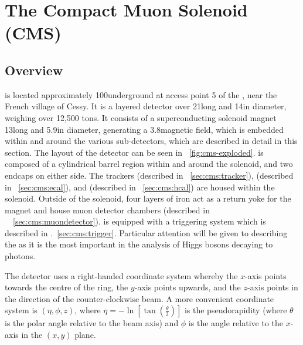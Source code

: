 \section{The Compact Muon Solenoid (CMS)}
\label{sec:cms}

\subsection{Overview}
\label{sec:cms:overview}

\CMS is located approximately 100\m underground at access point 5 of the \LHC, near the French village of Cessy. It is a layered detector over 21\m long and 14\m in diameter, weighing over 12,500 tons. It consists of a superconducting solenoid magnet 13\m long and 5.9\m in diameter, generating a 3.8\T magnetic field, which is embedded within and around the various sub-detectors, which are described in detail in this section. The layout of the \CMS detector can be seen in \Fig~\ref{fig:cms-exploded}. \CMS is composed of a cylindrical barrel region within and around the solenoid, and two endcaps on either side. The trackers (described in \Sec~\ref{sec:cms:tracker}), \ECAL (described in \Sec~\ref{sec:cms:ecal}), and \HCAL (described in \Sec~\ref{sec:cms:hcal}) are housed within the solenoid. Outside of the solenoid, four layers of iron act as a return yoke for the magnet and house muon detector chambers (described in \Sec~~\ref{sec:cms:muondetector}). \CMS is equipped with a triggering system which is described in \Sec.~\ref{sec:cms:trigger}. Particular attention will be given to describing the \ECAL as it is the most important \subdetector in the analysis of Higgs bosons decaying to photons.

The \CMS detector uses a right-handed coordinate system whereby the $x$-axis points towards the centre of the \LHC ring, the $y$-axis points upwards, and the $z$-axis points in the direction of the counter-clockwise beam. A more convenient coordinate system is $(\eta,\phi,z)$, where $\eta = -\ln [ \tan(\frac{\theta}{2})]$ is the pseudorapidity (where $\theta$ is the polar angle relative to the beam axis) and $\phi$ is the angle relative to the $x$-axis in the $(x,y)$ plane. 

